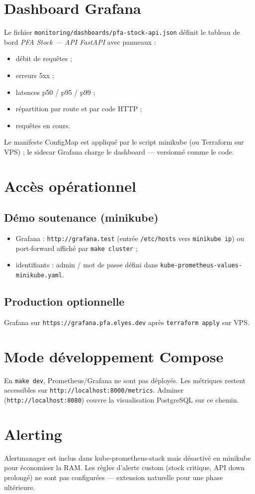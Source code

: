 \section{Dashboard Grafana}

Le fichier \texttt{monitoring/dashboards/pfa-stock-api.json} définit le tableau de bord \emph{PFA Stock — API FastAPI} avec panneaux :
\begin{itemize}
  \item débit de requêtes ;
  \item erreurs 5xx ;
  \item latences p50 / p95 / p99 ;
  \item répartition par route et par code HTTP ;
  \item requêtes en cours.
\end{itemize}

Le manifeste ConfigMap est appliqué par le script minikube (ou Terraform sur VPS) ; le sidecar Grafana charge le dashboard — versionné comme le code.

\section{Accès opérationnel}

\subsection{Démo soutenance (minikube)}

\begin{itemize}
  \item Grafana : \texttt{http://grafana.test} (entrée \texttt{/etc/hosts} vers \texttt{minikube ip}) ou port-forward affiché par \texttt{make cluster} ;
  \item identifiants : admin / mot de passe défini dans \texttt{kube-prometheus-values-minikube.yaml}.
\end{itemize}

\subsection{Production optionnelle}

Grafana sur \texttt{https://grafana.pfa.elyes.dev} après \texttt{terraform apply} sur VPS.

\section{Mode développement Compose}

En \texttt{make dev}, Prometheus/Grafana ne sont pas déployés. Les métriques restent accessibles sur \texttt{http://localhost:8000/metrics}. Adminer (\texttt{http://localhost:8080}) couvre la visualisation PostgreSQL sur ce chemin.

\section{Alerting}

Alertmanager est inclus dans kube-prometheus-stack mais désactivé en minikube pour économiser la RAM. Les règles d'alerte custom (stock critique, API down prolongé) ne sont pas configurées — extension naturelle pour une phase ultérieure.
